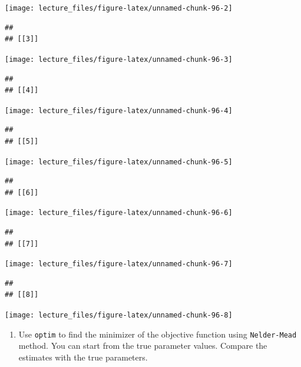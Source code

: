 \documentclass[
]{book}
\providecommand{\tightlist}{%
  \setlength{\itemsep}{0pt}\setlength{\parskip}{0pt}}
\begin{document}
\begin{center}\texttt{[image: lecture\_files/figure-latex/unnamed-chunk-96-2]} \end{center}

\begin{verbatim}
## 
## [[3]]
\end{verbatim}

\begin{center}\texttt{[image: lecture\_files/figure-latex/unnamed-chunk-96-3]} \end{center}

\begin{verbatim}
## 
## [[4]]
\end{verbatim}

\begin{center}\texttt{[image: lecture\_files/figure-latex/unnamed-chunk-96-4]} \end{center}

\begin{verbatim}
## 
## [[5]]
\end{verbatim}

\begin{center}\texttt{[image: lecture\_files/figure-latex/unnamed-chunk-96-5]} \end{center}

\begin{verbatim}
## 
## [[6]]
\end{verbatim}

\begin{center}\texttt{[image: lecture\_files/figure-latex/unnamed-chunk-96-6]} \end{center}

\begin{verbatim}
## 
## [[7]]
\end{verbatim}

\begin{center}\texttt{[image: lecture\_files/figure-latex/unnamed-chunk-96-7]} \end{center}

\begin{verbatim}
## 
## [[8]]
\end{verbatim}

\begin{center}\texttt{[image: lecture\_files/figure-latex/unnamed-chunk-96-8]} \end{center}

\begin{enumerate}
\def\labelenumi{\arabic{enumi}.}
\setcounter{enumi}{7}
\tightlist
\item
  Use \texttt{optim} to find the minimizer of the objective function using \texttt{Nelder-Mead} method. You can start from the true parameter values. Compare the estimates with the true parameters.
\end{enumerate}
\end{document}
